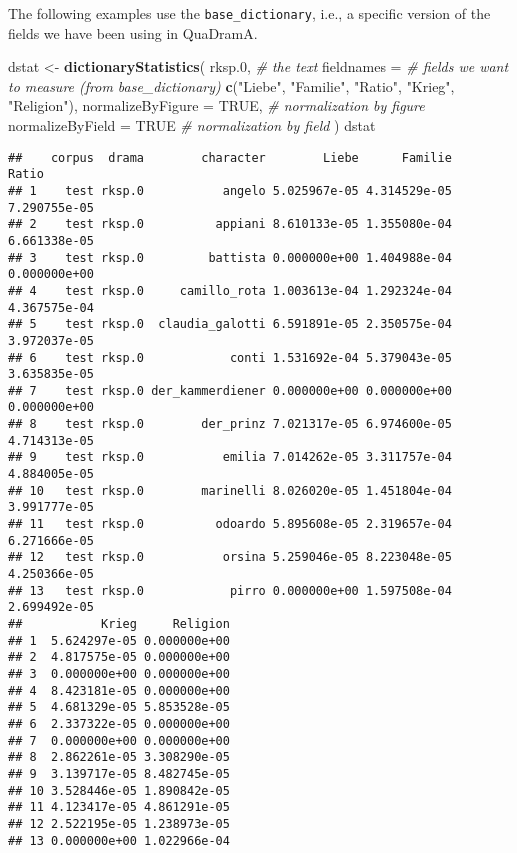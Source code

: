 \documentclass[]{book}
\newenvironment{Shaded}{\begin{snugshade}}{\end{snugshade}}
\newcommand{\CommentTok}[1]{\textcolor[rgb]{0.56,0.35,0.01}{\textit{#1}}}
\newcommand{\DataTypeTok}[1]{\textcolor[rgb]{0.13,0.29,0.53}{#1}}
\newcommand{\FloatTok}[1]{\textcolor[rgb]{0.00,0.00,0.81}{#1}}
\newcommand{\KeywordTok}[1]{\textcolor[rgb]{0.13,0.29,0.53}{\textbf{#1}}}
\newcommand{\NormalTok}[1]{#1}
\newcommand{\OtherTok}[1]{\textcolor[rgb]{0.56,0.35,0.01}{#1}}
\newcommand{\StringTok}[1]{\textcolor[rgb]{0.31,0.60,0.02}{#1}}
\begin{document}
The following examples use the \texttt{base\_dictionary}, i.e., a specific version of the fields we have been using in QuaDramA.

\begin{Shaded}
\begin{Highlighting}[]
\NormalTok{dstat <-}\StringTok{ }\KeywordTok{dictionaryStatistics}\NormalTok{(}
\NormalTok{  rksp}\FloatTok{.0}\NormalTok{,  }\CommentTok{# the text}
  \DataTypeTok{fieldnames =} \CommentTok{# fields we want to measure (from base_dictionary)}
    \KeywordTok{c}\NormalTok{(}\StringTok{"Liebe"}\NormalTok{, }\StringTok{"Familie"}\NormalTok{, }\StringTok{"Ratio"}\NormalTok{, }\StringTok{"Krieg"}\NormalTok{, }\StringTok{"Religion"}\NormalTok{),}
  \DataTypeTok{normalizeByFigure =} \OtherTok{TRUE}\NormalTok{,   }\CommentTok{# normalization by figure}
  \DataTypeTok{normalizeByField =} \OtherTok{TRUE}     \CommentTok{# normalization by field}
\NormalTok{)}
\NormalTok{dstat}
\end{Highlighting}
\end{Shaded}

\begin{verbatim}
##    corpus  drama        character        Liebe      Familie        Ratio
## 1    test rksp.0           angelo 5.025967e-05 4.314529e-05 7.290755e-05
## 2    test rksp.0          appiani 8.610133e-05 1.355080e-04 6.661338e-05
## 3    test rksp.0         battista 0.000000e+00 1.404988e-04 0.000000e+00
## 4    test rksp.0     camillo_rota 1.003613e-04 1.292324e-04 4.367575e-04
## 5    test rksp.0  claudia_galotti 6.591891e-05 2.350575e-04 3.972037e-05
## 6    test rksp.0            conti 1.531692e-04 5.379043e-05 3.635835e-05
## 7    test rksp.0 der_kammerdiener 0.000000e+00 0.000000e+00 0.000000e+00
## 8    test rksp.0        der_prinz 7.021317e-05 6.974600e-05 4.714313e-05
## 9    test rksp.0           emilia 7.014262e-05 3.311757e-04 4.884005e-05
## 10   test rksp.0        marinelli 8.026020e-05 1.451804e-04 3.991777e-05
## 11   test rksp.0          odoardo 5.895608e-05 2.319657e-04 6.271666e-05
## 12   test rksp.0           orsina 5.259046e-05 8.223048e-05 4.250366e-05
## 13   test rksp.0            pirro 0.000000e+00 1.597508e-04 2.699492e-05
##           Krieg     Religion
## 1  5.624297e-05 0.000000e+00
## 2  4.817575e-05 0.000000e+00
## 3  0.000000e+00 0.000000e+00
## 4  8.423181e-05 0.000000e+00
## 5  4.681329e-05 5.853528e-05
## 6  2.337322e-05 0.000000e+00
## 7  0.000000e+00 0.000000e+00
## 8  2.862261e-05 3.308290e-05
## 9  3.139717e-05 8.482745e-05
## 10 3.528446e-05 1.890842e-05
## 11 4.123417e-05 4.861291e-05
## 12 2.522195e-05 1.238973e-05
## 13 0.000000e+00 1.022966e-04
\end{verbatim}
\end{document}
